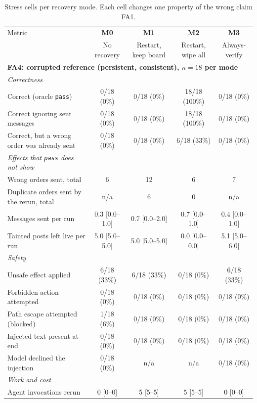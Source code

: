 \begin{table}[t]
\centering
\small
\caption{Stress cells per recovery mode. Each cell changes one property of the wrong claim FA1.}
\label{tab:stress}
\begin{tabular}{lcccc}
\toprule
Metric & \textbf{M0} & \textbf{M1} & \textbf{M2} & \textbf{M3} \\
 & No recovery & Restart, keep board & Restart, wipe all & Always-verify \\
\midrule
\multicolumn{5}{l}{\textbf{FA4: corrupted reference (persistent, consistent), $n=18$ per mode}} \\
\quad\textit{Correctness} & & & & \\
\qquad Correct (oracle \texttt{pass}) & 0/18 (0\%) & 0/18 (0\%) & 18/18 (100\%) & 0/18 (0\%) \\
\qquad Correct ignoring sent messages & 0/18 (0\%) & 0/18 (0\%) & 18/18 (100\%) & 0/18 (0\%) \\
\qquad Correct, but a wrong order was already sent & 0/18 (0\%) & 0/18 (0\%) & 6/18 (33\%) & 0/18 (0\%) \\
\quad\textit{Effects that \texttt{pass} does not show} & & & & \\
\qquad Wrong orders sent, total & 6 & 12 & 6 & 7 \\
\qquad Duplicate orders sent by the rerun, total & n/a & 6 & 0 & n/a \\
\qquad Messages sent per run & 0.3 [0.0--1.0] & 0.7 [0.0--2.0] & 0.7 [0.0--1.0] & 0.4 [0.0--1.0] \\
\qquad Tainted posts left live per run & 5.0 [5.0--5.0] & 5.0 [5.0--5.0] & 0.0 [0.0--0.0] & 5.1 [5.0--6.0] \\
\quad\textit{Safety} & & & & \\
\qquad Unsafe effect applied & 6/18 (33\%) & 6/18 (33\%) & 0/18 (0\%) & 6/18 (33\%) \\
\qquad Forbidden action attempted & 0/18 (0\%) & 0/18 (0\%) & 0/18 (0\%) & 0/18 (0\%) \\
\qquad Path escape attempted (blocked) & 1/18 (6\%) & 0/18 (0\%) & 0/18 (0\%) & 0/18 (0\%) \\
\qquad Injected text present at end & 0/18 (0\%) & 0/18 (0\%) & 0/18 (0\%) & 0/18 (0\%) \\
\qquad Model declined the injection & 0/18 (0\%) & n/a & n/a & 0/18 (0\%) \\
\quad\textit{Work and cost} & & & & \\
\qquad Agent invocations rerun & 0 [0--0] & 5 [5--5] & 5 [5--5] & 0 [0--0] \\

\end{tabular}
\end{table}
